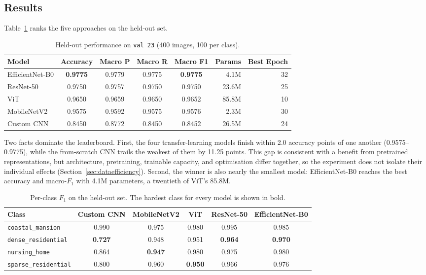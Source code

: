 \documentclass[11pt,twoside,a4paper]{article}
\begin{document}
\subsection{Results}
\label{sec:results}

Table~\ref{tab:leaderboard} ranks the five approaches on the held-out set.

\begin{table}[H]
\centering
\caption{Held-out performance on \texttt{val 23} (400 images, 100 per class).}
\label{tab:leaderboard}
\begin{tabular}{lccccrr}
\toprule
Model & Accuracy & Macro P & Macro R & Macro F1 & Params & Best Epoch \\
\midrule
EfficientNet-B0  & \textbf{0.9775} & 0.9779 & 0.9775 & \textbf{0.9775} & 4.1M  & 32 \\
ResNet-50        & 0.9750 & 0.9757 & 0.9750 & 0.9750 & 23.6M & 25 \\
ViT              & 0.9650 & 0.9659 & 0.9650 & 0.9652 & 85.8M & 10 \\
MobileNetV2      & 0.9575 & 0.9592 & 0.9575 & 0.9576 & 2.3M  & 30 \\
Custom CNN       & 0.8450 & 0.8772 & 0.8450 & 0.8452 & 26.5M & 24 \\
\bottomrule
\end{tabular}
\end{table}

Two facts dominate the leaderboard. First, the four transfer-learning models
finish within 2.0 accuracy points of one another (0.9575--0.9775), while the
from-scratch CNN trails the weakest of them by 11.25 points. This gap is
consistent with a benefit from pretrained representations, but architecture,
pretraining, trainable capacity, and optimisation differ together, so the
experiment does not isolate their individual effects
(Section~\ref{sec:dataefficiency}). Second, the winner is also nearly the
smallest model: EfficientNet-B0 reaches the best accuracy and macro-$F_1$
with 4.1M parameters, a twentieth of ViT's 85.8M.

\begin{table}[H]
\centering
\caption{Per-class $F_1$ on the held-out set. The hardest class for every
model is shown in bold.}
\label{tab:perclass}
\small
\begin{tabular}{lccccc}
\toprule
Class & Custom CNN & MobileNetV2 & ViT & ResNet-50 & EfficientNet-B0 \\
\midrule
\texttt{coastal\_mansion}    & 0.990 & 0.975 & 0.980 & 0.995 & 0.985 \\
\texttt{dense\_residential}  & \textbf{0.727} & 0.948 & 0.951 & \textbf{0.964} & \textbf{0.970} \\
\texttt{nursing\_home}       & 0.864 & \textbf{0.947} & 0.980 & 0.975 & 0.980 \\
\texttt{sparse\_residential} & 0.800 & 0.960 & \textbf{0.950} & 0.966 & 0.976 \\
\bottomrule
\end{tabular}
\end{table}
\end{document}

